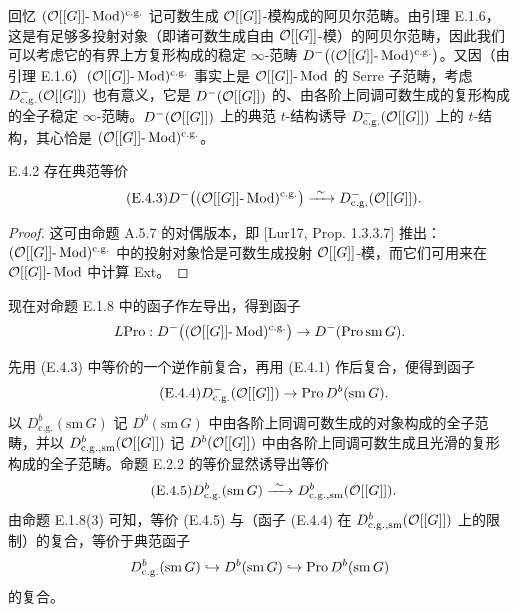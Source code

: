 回忆 $(\mathcal{O}[[G]]\text{-}\operatorname{Mod})^{\mathrm{c.g.}}$ 记可数生成 $\mathcal{O}[[G]]$-模构成的阿贝尔范畴。由引理 E.1.6，这是有足够多投射对象（即诸可数生成自由 $\mathcal{O}[[G]]$-模）的阿贝尔范畴，因此我们可以考虑它的有界上方复形构成的稳定 $\infty$-范畴 $D^-\bigl((\mathcal{O}[[G]]\text{-}\operatorname{Mod})^{\mathrm{c.g.}}\bigr)$。又因（由引理 E.1.6）$(\mathcal{O}[[G]]\text{-}\operatorname{Mod})^{\mathrm{c.g.}}$ 事实上是 $\mathcal{O}[[G]]\text{-}\operatorname{Mod}$ 的 Serre 子范畴，考虑 $D^-_{\mathrm{c.g.}}(\mathcal{O}[[G]])$ 也有意义，它是 $D^-(\mathcal{O}[[G]])$ 的、由各阶上同调可数生成的复形构成的全子稳定 $\infty$-范畴。$D^-(\mathcal{O}[[G]])$ 上的典范 $t$-结构诱导 $D^-_{\mathrm{c.g.}}(\mathcal{O}[[G]])$ 上的 $t$-结构，其心恰是 $(\mathcal{O}[[G]]\text{-}\operatorname{Mod})^{\mathrm{c.g.}}$。

\begin{lem}{E.4.2}\label{thm:a4-20-20}
存在典范等价
\begin{equation}\tag{E.4.3}\label{eq:a4-20-3}
D^-\bigl((\mathcal{O}[[G]]\text{-}\operatorname{Mod})^{\mathrm{c.g.}}\bigr)\xrightarrow{\ \sim\ } D^-_{\mathrm{c.g.}}(\mathcal{O}[[G]]).
\end{equation}
\end{lem}

\begin{proof}
这可由命题 A.5.7 的对偶版本，即 [Lur17, Prop. 1.3.3.7] 推出：$(\mathcal{O}[[G]]\text{-}\operatorname{Mod})^{\mathrm{c.g.}}$ 中的投射对象恰是可数生成投射 $\mathcal{O}[[G]]$-模，而它们可用来在 $\mathcal{O}[[G]]\text{-}\operatorname{Mod}$ 中计算 Ext。
\end{proof}

现在对命题 E.1.8 中的函子作左导出，得到函子
\[
L\mathrm{Pro}:D^-\bigl((\mathcal{O}[[G]]\text{-}\operatorname{Mod})^{\mathrm{c.g.}}\bigr)\to D^-(\mathrm{Pro}\,\mathrm{sm}\,G).
\]


先用 (E.4.3) 中等价的一个逆作前复合，再用 (E.4.1) 作后复合，便得到函子
\begin{equation}\tag{E.4.4}\label{eq:a4-20-4}
D^-_{\mathrm{c.g.}}(\mathcal{O}[[G]])\to\mathrm{Pro}\,D^b(\mathrm{sm}\,G).
\end{equation}
以 $D^b_{\mathrm{c.g.}}(\mathrm{sm}\,G)$ 记 $D^b(\mathrm{sm}\,G)$ 中由各阶上同调可数生成的对象构成的全子范畴，并以 $D^b_{\mathrm{c.g.},\mathrm{sm}}(\mathcal{O}[[G]])$ 记 $D^b(\mathcal{O}[[G]])$ 中由各阶上同调可数生成且光滑的复形构成的全子范畴。命题 E.2.2 的等价显然诱导出等价
\begin{equation}\tag{E.4.5}\label{eq:a4-20-5}
D^b_{\mathrm{c.g.}}(\mathrm{sm}\,G)\xrightarrow{\ \sim\ } D^b_{\mathrm{c.g.},\mathrm{sm}}(\mathcal{O}[[G]]).
\end{equation}
由命题 E.1.8(3) 可知，等价 (E.4.5) 与（函子 (E.4.4) 在 $D^b_{\mathrm{c.g.},\mathrm{sm}}(\mathcal{O}[[G]])$ 上的限制）的复合，等价于典范函子
\[
D^b_{\mathrm{c.g.}}(\mathrm{sm}\,G)\hookrightarrow D^b(\mathrm{sm}\,G)\hookrightarrow\mathrm{Pro}\,D^b(\mathrm{sm}\,G)
\]
的复合。

